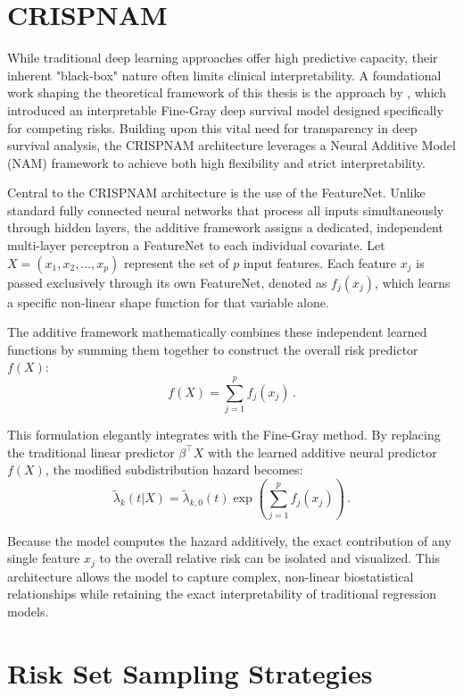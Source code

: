 \documentclass[a4paper,twoside,12pt]{report}
\begin{document}
\section{CRISPNAM}

While traditional deep learning approaches offer high predictive capacity, their inherent "black-box" nature often limits clinical interpretability. A foundational work shaping the theoretical framework of this thesis is the approach by \citep{InterpretableFineGray2025}, which introduced an interpretable Fine-Gray deep survival model designed specifically for competing risks. Building upon this vital need for transparency in deep survival analysis, the CRISPNAM architecture leverages a Neural Additive Model (NAM) framework to achieve both high flexibility and strict interpretability.

Central to the CRISPNAM architecture is the use of the FeatureNet. Unlike standard fully connected neural networks that process all inputs simultaneously through hidden layers, the additive framework assigns a dedicated, independent multi-layer perceptron a FeatureNet to each individual covariate. Let $X = (x_1, x_2, \dots, x_p)$ represent the set of $p$ input features. Each feature $x_j$ is passed exclusively through its own FeatureNet, denoted as $f_j(x_j)$, which learns a specific non-linear shape function for that variable alone. 

The additive framework mathematically combines these independent learned functions by summing them together to construct the overall risk predictor $f(X)$:
$$f(X) = \sum_{j=1}^p f_j(x_j) \,.$$

This formulation elegantly integrates with the Fine-Gray method. By replacing the traditional linear predictor $\beta^\top X$ with the learned additive neural predictor $f(X)$, the modified subdistribution hazard becomes:
$$\tilde{\lambda}_k(t|X) = \tilde{\lambda}_{k,0}(t)\exp\left(\sum_{j=1}^p f_j(x_j)\right) \,.$$

Because the model computes the hazard additively, the exact contribution of any single feature $x_j$ to the overall relative risk can be isolated and visualized. This architecture allows the model to capture complex, non-linear biostatistical relationships while retaining the exact interpretability of traditional regression models.


\section{Risk Set Sampling Strategies}
\end{document}
